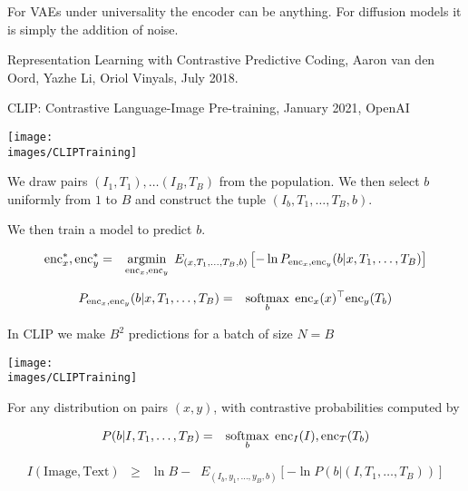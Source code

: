 {{\vfill

For VAEs under universality the encoder can be anything.  For diffusion models it is simply the addition of noise.
}

Representation Learning with Contrastive Predictive Coding,
Aaron van den Oord, Yazhe Li, Oriol Vinyals, July 2018.

\vfill
CLIP: Contrastive Language-Image Pre-training, January 2021, OpenAI




\centerline{\texttt{[image: \\images/CLIPTraining]}}


We draw pairs $(I_1,T_1), \ldots (I_B,T_B)$ from the population.
We then select $b$ uniformly from $1$ to $B$ and construct the tuple $(I_b,T_1,\ldots,T_B,b)$.

\vfill
We then train a model to predict $b$.
\vfill
{\huge
\begin{eqnarray*}
\mathrm{enc}_x^*,\mathrm{enc}_y^* & = & \operatorname*{argmin}_{\mathrm{enc}_x,\mathrm{enc}_y} \;E_{(x,T_1,\ldots,T_B,b)}\left[-\ln P_{\mathrm{enc}_x,\mathrm{enc}_y}(b|x,T_1,\ldots,T_B)\right]
\end{eqnarray*}

\begin{eqnarray*}
P_{\mathrm{enc}_x,\mathrm{enc}_y}(b|x,T_1,\ldots,T_B) & = & \operatorname*{softmax}_b\; \mathrm{enc}_x(x)^\top\mathrm{enc}_y(T_b)
\end{eqnarray*}
}


In CLIP we make $B^2$ predictions for a batch of size $N = B$
\centerline{\texttt{[image: \\images/CLIPTraining]}}



For any distribution on pairs $(x,y)$, with contrastive probabilities computed by

\begin{eqnarray*}
P(b|I,T_1,\ldots,T_B) & = & \operatorname*{softmax}_b\;\mathrm{enc}_I(I),\mathrm{enc}_T(T_b)
\end{eqnarray*}

{\huge
\begin{eqnarray*}
I(\mathrm{Image},\mathrm{Text}) & \geq & \ln B - \;\;E_{(I_b,y_1,\ldots,y_B,b)}\left[-\ln P(b|(I,T_1,\ldots,T_B))\right]
\end{eqnarray*}
}

}
